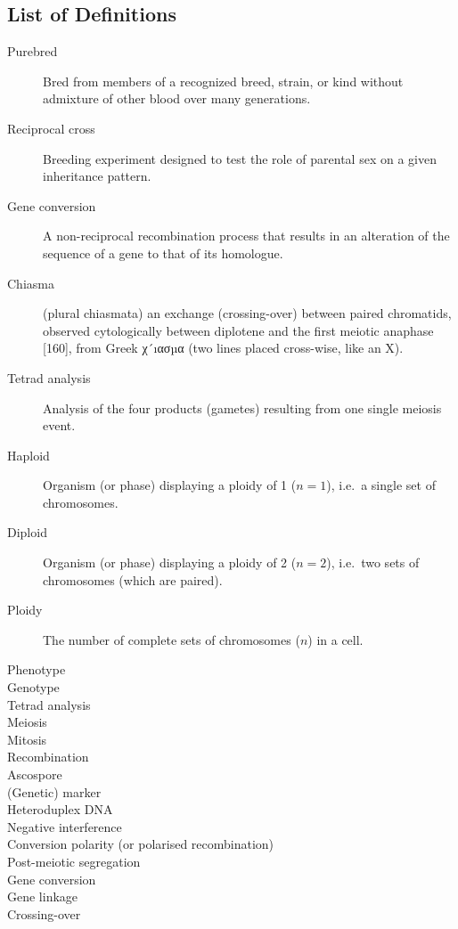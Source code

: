 \begin{alwayssingle}\chapter*{List of Definitions}
	\thispagestyle{empty}
	\pagestyle{empty}
	\setlength{\baselineskip}{\frontmatterbaselineskip}
	\begin{description}

		\item[Purebred] Bred from members of a recognized breed, strain, or kind without admixture of other blood over many generations.
		\item[Reciprocal cross] Breeding experiment designed to test the role of parental sex on a given inheritance pattern.
		\item[Gene conversion] A non-reciprocal recombination process that results in an alteration of the sequence of a gene to that of its homologue.
		\item[Chiasma] (plural chiasmata) an exchange (crossing-over) between paired chromatids, observed cytologically between diplotene and the first meiotic anaphase [160], from Greek χ´ıασµα (two lines placed cross-wise, like an X).
		\item[Tetrad analysis] Analysis of the four products (gametes) resulting from one single meiosis event.
		\item[Haploid] Organism (or phase) displaying a ploidy of 1 ($n=1$), i.e.\ a single set of chromosomes.
		\item[Diploid] Organism (or phase) displaying a ploidy of 2 ($n=2$), i.e.\ two sets of chromosomes (which are paired).
		\item[Ploidy] The number of complete sets of chromosomes ($n$) in a cell. 
		\item[Phenotype]
		\item[Genotype]
		\item[Tetrad analysis]
		\item[Meiosis]
		\item[Mitosis]
		\item[Recombination]
		\item[Ascospore]
		\item[(Genetic) marker]
		\item[Heteroduplex DNA]
		\item[Negative interference]
		\item[Conversion polarity (or polarised recombination)]
		\item[Post-meiotic segregation]
		\item[Gene conversion]
		\item[Gene linkage]
		\item[Crossing-over]


	\end{description}
\end{alwayssingle}
\mtcaddchapter{}


